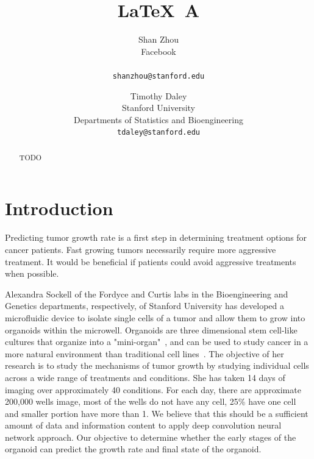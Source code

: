 \documentclass[10pt,twocolumn,letterpaper]{article}
\begin{document}
\title{\LaTeX\ A }

\author{Shan Zhou \\
Facebook \\
\\
{\tt\small shanzhou@stanford.edu}
\and
Timothy Daley \\
Stanford University \\
Departments of Statistics and Bioengineering \\
{\tt\small tdaley@stanford.edu}
}

\maketitle

\begin{abstract}
TODO   
\end{abstract}

\section{Introduction}

Predicting tumor growth rate is a first step in determining treatment options for cancer patients.  Fast growing tumors necessarily require more aggressive treatment.  It would be beneficial if patients could avoid aggressive treatments when possible.  

Alexandra Sockell of the Fordyce and Curtis labs in the Bioengineering and Genetics departments, respectively, of Stanford University has developed a microfluidic device to isolate single cells of a tumor and allow them to grow into organoids  within the microwell.  Organoids are three dimensional stem cell-like cultures that organize into a "mini-organ"~\cite{rios2018imaging}, and can be used to study cancer in a more natural environment than traditional cell lines~\cite{drost2018organoids}.
The objective of her research is to study the mechanisms of tumor growth by studying individual cells across a wide range of treatments and conditions.  She has taken 14 days of imaging over approximately 40 conditions.    For each day, there are approximate 200,000 wells image, most of the wells do not have any cell, 25\% have one cell and smaller portion have more than 1.  We believe that this should be a sufficient amount of data and information content to apply deep convolution neural network approach.  Our objective to determine whether the early stages of the organoid can predict the growth rate and final state of the organoid.    
\end{document}
